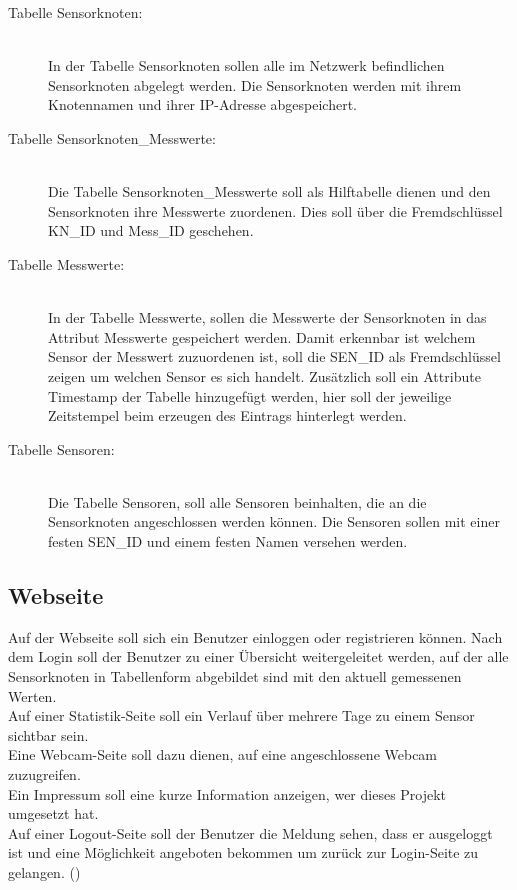 \begin{description}
	\item[Tabelle Sensorknoten:] \hfill \\
		In der Tabelle Sensorknoten sollen alle im Netzwerk befindlichen Sensorknoten abgelegt werden. Die Sensorknoten werden mit ihrem Knotennamen und ihrer IP-Adresse abgespeichert.
	\item[Tabelle Sensorknoten\_Messwerte:] \hfill \\
		Die Tabelle Sensorknoten\_Messwerte soll als Hilftabelle dienen und den Sensorknoten ihre Messwerte zuordenen. Dies soll über die Fremdschlüssel KN\_ID und Mess\_ID geschehen.
	\item[Tabelle Messwerte:] \hfill \\
		In der Tabelle Messwerte, sollen die Messwerte der Sensorknoten in das Attribut Messwerte gespeichert werden. Damit erkennbar ist welchem Sensor der Messwert zuzuordenen ist, soll die SEN\_ID als Fremdschlüssel zeigen um welchen Sensor es sich handelt. Zusätzlich soll ein Attribute Timestamp der Tabelle hinzugefügt werden, hier soll der jeweilige Zeitstempel beim erzeugen des Eintrags hinterlegt werden.
	\item[Tabelle Sensoren:] \hfill \\	
		Die Tabelle Sensoren, soll alle Sensoren beinhalten, die an die Sensorknoten angeschlossen werden können. Die Sensoren sollen mit einer festen SEN\_ID und einem festen Namen versehen werden.
\end{description}

\subsection{Webseite}\label{sub:Webseite}

Auf der Webseite soll sich ein Benutzer einloggen oder registrieren können.
Nach dem Login soll der Benutzer zu einer Übersicht weitergeleitet werden, auf der alle Sensorknoten in
Tabellenform abgebildet sind mit den aktuell gemessenen Werten. \\
Auf einer Statistik-Seite soll ein Verlauf über mehrere Tage zu einem Sensor sichtbar sein.\\
Eine Webcam-Seite soll dazu dienen, auf eine angeschlossene Webcam zuzugreifen.\\
Ein Impressum soll eine kurze Information anzeigen, wer dieses Projekt umgesetzt hat.\\
Auf einer Logout-Seite soll der Benutzer die Meldung sehen, dass er ausgeloggt ist und eine Möglichkeit angeboten bekommen um zurück zur Login-Seite zu gelangen.
()

